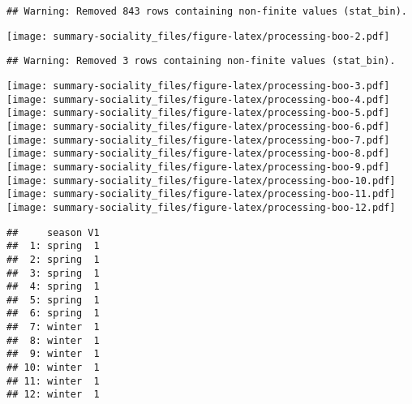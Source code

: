 \documentclass[]{article}
\begin{document}
\begin{verbatim}
## Warning: Removed 843 rows containing non-finite values (stat_bin).
\end{verbatim}

\texttt{[image: summary-sociality\_files/figure-latex/processing-boo-2.pdf]}

\begin{verbatim}
## Warning: Removed 3 rows containing non-finite values (stat_bin).
\end{verbatim}

\texttt{[image: summary-sociality\_files/figure-latex/processing-boo-3.pdf]}
\texttt{[image: summary-sociality\_files/figure-latex/processing-boo-4.pdf]}
\texttt{[image: summary-sociality\_files/figure-latex/processing-boo-5.pdf]}
\texttt{[image: summary-sociality\_files/figure-latex/processing-boo-6.pdf]}
\texttt{[image: summary-sociality\_files/figure-latex/processing-boo-7.pdf]}
\texttt{[image: summary-sociality\_files/figure-latex/processing-boo-8.pdf]}
\texttt{[image: summary-sociality\_files/figure-latex/processing-boo-9.pdf]}
\texttt{[image: summary-sociality\_files/figure-latex/processing-boo-10.pdf]}
\texttt{[image: summary-sociality\_files/figure-latex/processing-boo-11.pdf]}
\texttt{[image: summary-sociality\_files/figure-latex/processing-boo-12.pdf]}

\begin{verbatim}
##     season V1
##  1: spring  1
##  2: spring  1
##  3: spring  1
##  4: spring  1
##  5: spring  1
##  6: spring  1
##  7: winter  1
##  8: winter  1
##  9: winter  1
## 10: winter  1
## 11: winter  1
## 12: winter  1
\end{verbatim}
\end{document}
